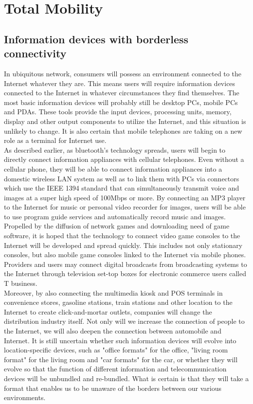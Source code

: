 \documentclass[12pt]{report}
\begin{document}
\chapter{Total Mobility}

\section{Information devices with borderless connectivity}
\hspace*{0.5in}In ubiquitous network, consumers will possess an environment connected to the Internet whatever they are. This means users will require information devices connected to the Internet in whatever circumstances they find themselves. The most basic information devices will probably still be desktop PCs, mobile PCs and PDAs. These tools provide the input devices, processing units, memory, display and other output components to utilize the Internet, and this situation is unlikely to change. It is also certain that mobile telephones are taking on a new role as a terminal for Internet use.
\\\hspace*{0.5in}As described earlier, as bluetooth's technology spreads, users will begin to directly connect information appliances with cellular telephones. Even without a cellular phone, they will be able to connect information appliances into a domestic wireless LAN system as well as to link them with PCs via connectors which use the IEEE 1394 standard that can simultaneously transmit voice and images at a super high speed of 100Mbps or more. By connecting an MP3 player to the Internet for music or personal video recorder for images, users will be able to use program guide services and automatically record music and images. Propelled by the diffusion of network games and downloading need of game software, it is hoped that the technology to connect video game consoles to the Internet will be developed and spread quickly. This includes not only stationary consoles, but also mobile game consoles linked to the Internet via mobile phones. Providers and users may connect digital broadcasts from broadcasting systems to the Internet through television set-top boxes for electronic commerce users called T business.
\\\hspace*{0.5in}Moreover, by also connecting the multimedia kiosk and POS terminals in convenience stores, gasoline stations, train stations and other location to the Internet to create click-and-mortar outlets, companies will change the distribution industry itself. Not only will we increase the connection of people to the Internet, we will also deepen the connection between automobile and Internet. It is still uncertain whether such information devices will evolve into location-specific devices, such as "office formats" for the office, "living room format" for the living room and "car formats" for the car, or whether they will evolve so that the function of different information and telecommunication devices will be unbundled and re-bundled. What is certain is that they will take a format that enables us to be unaware of the borders between our various environments.\\
\end{document}
